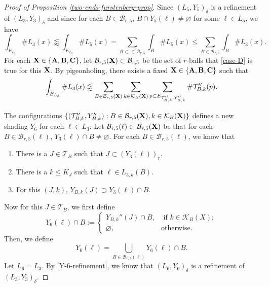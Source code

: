 \documentclass{amsart}
\numberwithin{equation}{section}
\newcommand{\de}{\delta}
\newcommand{\cb}{\mathcal B}
\newcommand{\ck}{{\mathcal K}}
\newcommand{\cT}{{\mathcal T}}
\begin{document}
\begin{proof}[Proof of Proposition \ref{two-ends-furstenberg-prop}]
Since $(L_5, Y_5)_\de$ is a refinement of $(L_3,Y_3)_\de$ and since for each $B\in\cb_{r,5}$, $B\cap Y_5(\ell)\not=\varnothing$ for some $\ell\in L_5$, we have 
\begin{equation}
    \int_{E_{L_3}}\# L_3(x)\lessapprox\int_{E_{L_5}}\# L_5(x)=\sum_{B\subset\in\cb_{r,5}}\int_{B}\#L_5(x)\leq\sum_{B\in\cb_{r,5}}\int_{B}\#L_3(x) .
\end{equation}
For each $\bf X\in\{\bf A, B, C\}$, let $\cb_{r,5}({\bf X})\subset \cb_{r,5}$ be the set of $r$-balls that \eqref{case-D} is true for this ${\bf X}$.
By pigeonholing, there exists a fixed $\bf X\in\{\bf A, B, C\}$ such that
\begin{equation}
\label{Y-6-refinement}
    \int_{E_{L_3}}\# L_3(x)\lessapprox\sum_{B\in\cb_{r,5}(\bf X)}\sum_{k\in\ck_B(\bf X)}\sum_{p\subset E_{\cT_{B,k}'', Y_{B,k}''}}\#\cT_{B,k}''(p) .
\end{equation}

The configurations $\{(\cT_{B,k}'', Y_{B,k}''):B\in\cb_{r,5}({\bf X}), k\in \ck_B(\bf X)\}$ defines a new shading $Y_6$ for each $\ell\in L_3$: 
Let $\cb_{r,5}(\ell)\subset\cb_{r,5}({\bf X})$ be that for each $B\in\cb_{r,5}(\ell)$, $Y_3(\ell)\cap B\not=\varnothing$. 
For each $B\in\cb_{r,5}(\ell)$, we know that 
\begin{enumerate}
    \item There is a $J\in\cT_B$ such that $J\subset (Y_3(\ell))_r$.
    \item There is a $k\leq K_J$ such that $\ell\in L_{3,k}(B)$.
    \item For this $(J,k)$, $Y_{B,k}(J)\supset Y_3(\ell)\cap B$.
\end{enumerate}
Now for this $J\in\cT_B$, we first define
\begin{equation}
\label{Y-6-local}
    Y_6(\ell)\cap B:=\left\{\begin{array}{cc}
    Y_{B,k}''(J)\cap B, & \text{ if } k\in\ck_B(X);\\
    \varnothing,     & \text{otherwise}.
    \end{array}\right.
\end{equation}
Then, we define
\begin{equation}
\label{Y-6}
    Y_6(\ell)=\bigcup_{B\in\cb_{r,5}(\ell)}Y_6(\ell)\cap B.
\end{equation}
Let $L_6=L_3$. By \eqref{Y-6-refinement}, we know that $(L_6, Y_6)_\de$ is a refinement of $(L_3, Y_3)_\de$.


\end{proof}
\end{document}
